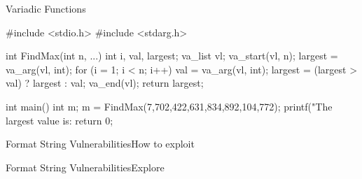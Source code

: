 \begin{slide}{Variadic Functions}{}
  \begin{nicscolumn}
    \begin{nicsextern}[height=6cm]{}
      #include <stdio.h>
      #include <stdarg.h>

      int FindMax(int n, ...) {
        int i, val, largest;
        va_list vl;
        va_start(vl, n);
        largest = va_arg(vl, int);
        for (i = 1; i < n; i++) {
          val = va_arg(vl, int);
          largest = (largest > val) ? largest : val;
        }
        va_end(vl);
        return largest;
      }

      int main() {
        int m;
        m = FindMax(7,702,422,631,834,892,104,772);
        printf("The largest value is: %
        return 0;
      }
    \end{nicsextern}
  \end{nicscolumn}
\end{slide}

\begin{slide}{Format String Vulnerabilities}{How to exploit}
  \begin{nicscolumn}
    \begin{nicsindent}
    \end{nicsindent}
  \end{nicscolumn}
\end{slide}

\begin{slide}{Format String Vulnerabilities}{Explore}
  \begin{nicscolumn}
    \begin{nicsindent}
    \end{nicsindent}
  \end{nicscolumn}
\end{slide}

